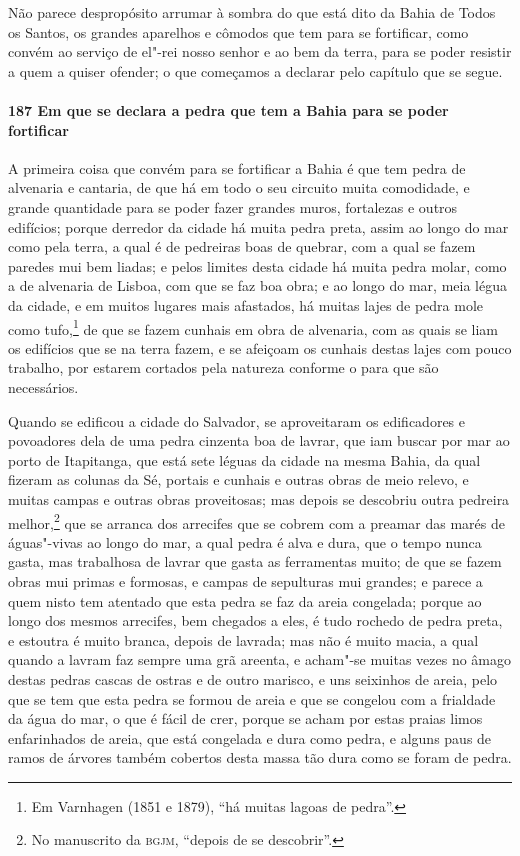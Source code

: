 Não parece despropósito arrumar à sombra do que está dito da Bahia de Todos os Santos, os
grandes aparelhos e cômodos que tem para se fortificar, como convém ao serviço de el"-rei
nosso senhor e ao bem da terra, para se poder resistir a quem a quiser ofender; o que
começamos a declarar pelo capítulo que se segue.

\paragraph{187 Em que se declara a pedra que tem a Bahia para se poder fortificar}

A primeira coisa que convém para se fortificar a Bahia é que tem pedra de alvenaria e
cantaria, de que há em todo o seu circuito muita comodidade, e grande quantidade para se
poder fazer grandes muros, fortalezas e outros edifícios; porque derredor da cidade há
muita pedra preta, assim ao longo do mar como pela terra, a qual é de pedreiras boas de
quebrar, com a qual se fazem paredes mui bem liadas; e pelos limites desta cidade há muita
pedra molar, como a de alvenaria de Lisboa, com que se faz boa obra; e ao longo do mar,
meia légua da cidade, e em muitos lugares mais afastados, há muitas lajes de pedra mole
como tufo,\footnote{ Em Varnhagen (1851 e 1879), ``há muitas lagoas de pedra''.} de que se
fazem cunhais em obra de alvenaria, com as quais se liam os edifícios que se na terra
fazem, e se afeiçoam os cunhais destas lajes com pouco trabalho, por estarem cortados pela
natureza conforme o para que são necessários.

Quando se edificou a cidade do Salvador, se aproveitaram os edificadores e povoadores dela
de uma pedra cinzenta boa de lavrar, que iam buscar por mar ao porto de Itapitanga, que
está sete léguas da cidade na mesma Bahia, da qual fizeram as colunas da Sé, portais e
cunhais e outras obras de meio relevo, e muitas campas e outras obras proveitosas; mas
depois se descobriu outra pedreira melhor,\footnote{ No manuscrito da \textsc{bgjm},
``depois de se descobrir''.} que se arranca dos arrecifes que se cobrem com a preamar das
marés de águas"-vivas ao longo do mar, a qual pedra é alva e dura, que o tempo nunca gasta,
mas trabalhosa de lavrar que gasta as ferramentas muito; de que se fazem obras mui primas
e formosas, e campas de sepulturas mui grandes; e parece a quem nisto tem atentado que
esta pedra se faz da areia congelada; porque ao longo dos mesmos arrecifes, bem chegados a
eles, é tudo rochedo de pedra preta, e estoutra é muito branca, depois de lavrada; mas não
é muito macia, a qual quando a lavram faz sempre uma grã areenta, e acham"-se muitas vezes
no âmago destas pedras cascas de ostras e de outro marisco, e uns seixinhos de areia, pelo
que se tem que esta pedra se formou de areia e que se congelou com a frialdade da água do
mar, o que é fácil de crer, porque se acham por estas praias limos enfarinhados de areia,
que está congelada e dura como pedra, e alguns paus de ramos de árvores também cobertos
desta massa tão dura como se foram de pedra.

